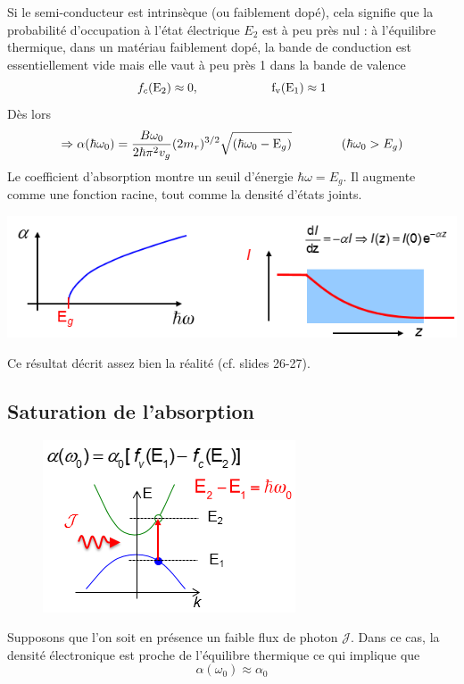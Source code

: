 	Si le semi-conducteur est intrinsèque (ou faiblement dopé), cela signifie que la probabilité 
	d'occupation à l'état électrique $E_2$ est à peu près nul : à l'équilibre thermique, dans un 
	matériau faiblement dopé, la bande de conduction est essentiellement vide mais elle vaut à peu
	près 1 dans la bande de valence
	\begin{equation}
	{f_c}({{\rm{E}}_2}) \approx 0,\qquad\qquad\qquad\rm{  }{f_v}({{\rm{E}}_1}) \approx 1
	\end{equation}
	Dès lors
	\begin{equation}
	\Rightarrow \alpha (\hbar {\omega _0}) = \frac{{B{\omega _0}}}{{2\hbar {\pi ^2}{v_g}}
	}{(2{m_r})^{3/2}}\sqrt {(\hbar {\omega _0} - {{\rm{E}}_g})} \qquad\qquad
	(\hbar\omega_0>E_g)
	\end{equation}
	Le coefficient d'absorption montre un seuil d'énergie $\hbar\omega=E_g$. Il augmente comme une 
	fonction racine, tout comme la densité d'états joints.
	\begin{center}
	\includegraphics[scale=0.6]{ch5/image22}
	\end{center}	
	Ce résultat décrit assez bien la réalité (cf. slides 26-27).
		
	
	\subsection{Saturation de l'absorption}
	\begin{figure}
	\vspace{-20mm}
	\includegraphics[scale=0.6]{ch5/image23}
	\end{figure}	
	Supposons que l'on soit en présence un faible flux de photon $\mathcal{J}$. Dans ce cas, la 
	densité électronique est proche de l'équilibre thermique ce qui implique que 
	\begin{equation}
	\alpha(\omega_0) \approx \alpha_0
	\end{equation}
	
